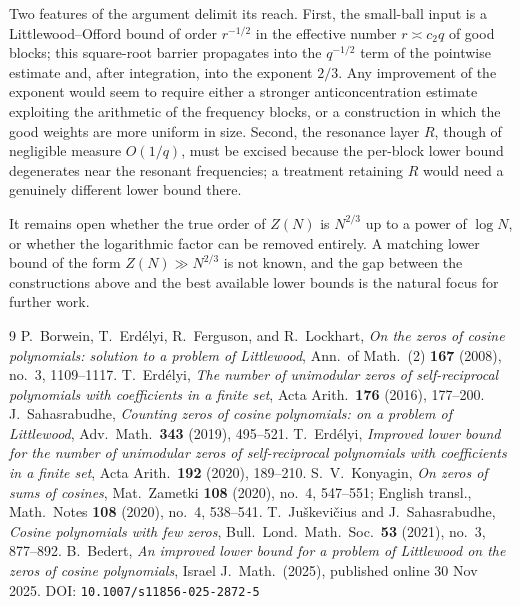 \documentclass[11pt,reqno]{amsart}
\theoremstyle{plain}
\theoremstyle{definition}
\theoremstyle{remark}
\begin{document}
Two features of the argument delimit its reach. First, the small-ball input is a Littlewood--Offord bound of order $r^{-1/2}$ in the effective number $r\asymp c_2 q$ of good blocks; this square-root barrier propagates into the $q^{-1/2}$ term of the pointwise estimate and, after integration, into the exponent $2/3$. Any improvement of the exponent would seem to require either a stronger anticoncentration estimate exploiting the arithmetic of the frequency blocks, or a construction in which the good weights are more uniform in size. Second, the resonance layer $R$, though of negligible measure $O(1/q)$, must be excised because the per-block lower bound degenerates near the resonant frequencies; a treatment retaining $R$ would need a genuinely different lower bound there.

It remains open whether the true order of $Z(N)$ is $N^{2/3}$ up to a power of $\log N$, or whether the logarithmic factor can be removed entirely. A matching lower bound of the form $Z(N)\gg N^{2/3}$ is not known, and the gap between the constructions above and the best available lower bounds is the natural focus for further work.

\begin{thebibliography}{9}
P.~Borwein, T.~Erd\'elyi, R.~Ferguson, and R.~Lockhart,
\textit{On the zeros of cosine polynomials: solution to a problem of Littlewood},
Ann.\ of Math.\ (2) \textbf{167} (2008), no.~3, 1109--1117.
T.~Erd\'elyi,
\textit{The number of unimodular zeros of self-reciprocal polynomials with coefficients in a finite set},
Acta Arith.\ \textbf{176} (2016), 177--200.
J.~Sahasrabudhe,
\textit{Counting zeros of cosine polynomials: on a problem of Littlewood},
Adv.\ Math.\ \textbf{343} (2019), 495--521.
T.~Erd\'elyi,
\textit{Improved lower bound for the number of unimodular zeros of self-reciprocal polynomials with coefficients in a finite set},
Acta Arith.\ \textbf{192} (2020), 189--210.
S.~V.~Konyagin,
\textit{On zeros of sums of cosines},
Mat.\ Zametki \textbf{108} (2020), no.~4, 547--551;
English transl., Math.\ Notes \textbf{108} (2020), no.~4, 538--541.
T.~Ju\v{s}kevi\v{c}ius and J.~Sahasrabudhe,
\textit{Cosine polynomials with few zeros},
Bull.\ Lond.\ Math.\ Soc.\ \textbf{53} (2021), no.~3, 877--892.
B.~Bedert,
\textit{An improved lower bound for a problem of Littlewood on the zeros of cosine polynomials},
Israel J.\ Math.\ (2025), published online 30 Nov 2025.
DOI: \texttt{10.1007/s11856-025-2872-5}
\end{thebibliography}
\end{document}
